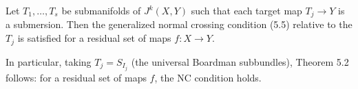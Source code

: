 Let $T_1,\ldots,T_s$ be submanifolds of $J^k(X, Y)$ such that each target map $T_j \to Y$ is a submersion. Then the generalized normal crossing condition (5.5) relative to the $T_j$ is satisfied for a residual set of maps $f: X \to Y$.

In particular, taking $T_j = S_{I_j}$ (the universal Boardman subbundles), Theorem 5.2 follows: for a residual set of maps $f$, the NC condition holds.

